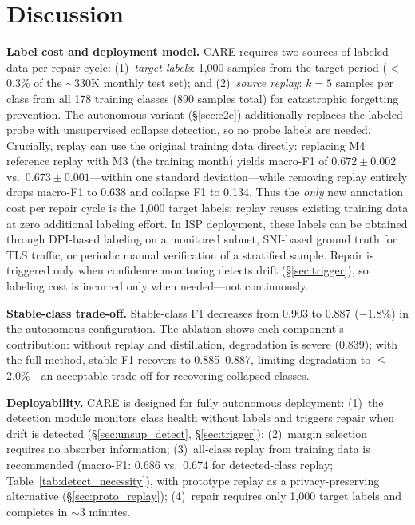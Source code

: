 \documentclass[journal]{IEEEtran}
\newcommand{\ours}{CARE}  %
\begin{document}
\section{Discussion}
\label{sec:discussion}

\textbf{Label cost and deployment model.}
\ours{} requires two sources of labeled data per repair cycle: (1)~\textit{target labels}: 1{,}000 samples from the target period ($<$0.3\% of the ${\sim}$330K monthly test set); and (2)~\textit{source replay}: $k{=}5$ samples per class from all 178 training classes (890 samples total) for catastrophic forgetting prevention.
The autonomous variant (\S\ref{sec:e2e}) additionally replaces the labeled probe with unsupervised collapse detection, so no probe labels are needed.
Crucially, replay can use the original training data directly: replacing M4 reference replay with M3 (the training month) yields macro-F1 of $0.672{\pm}0.002$ vs.\ $0.673{\pm}0.001$---within one standard deviation---while removing replay entirely drops macro-F1 to 0.638 and collapse F1 to 0.134.
Thus the \textit{only} new annotation cost per repair cycle is the 1{,}000 target labels; replay reuses existing training data at zero additional labeling effort.
In ISP deployment, these labels can be obtained through DPI-based labeling on a monitored subnet, SNI-based ground truth for TLS traffic, or periodic manual verification of a stratified sample.
Repair is triggered only when confidence monitoring detects drift (\S\ref{sec:trigger}), so labeling cost is incurred only when needed---not continuously.

\textbf{Stable-class trade-off.}
Stable-class F1 decreases from 0.903 to 0.887 ($-$1.8\%) in the autonomous configuration.
The ablation shows each component's contribution: without replay and distillation, degradation is severe (0.839); with the full method, stable F1 recovers to 0.885--0.887, limiting degradation to ${\leq}$2.0\%---an acceptable trade-off for recovering collapsed classes.

\textbf{Deployability.}
\ours{} is designed for fully autonomous deployment:
(1)~the detection module monitors class health without labels and triggers repair when drift is detected (\S\ref{sec:unsup_detect}, \S\ref{sec:trigger});
(2)~margin selection requires no absorber information;
(3)~all-class replay from training data is recommended (macro-F1: 0.686 vs.\ 0.674 for detected-class replay; Table~\ref{tab:detect_necessity}), with prototype replay as a privacy-preserving alternative (\S\ref{sec:proto_replay});
(4)~repair requires only 1{,}000 target labels and completes in ${\sim}$3 minutes.
\end{document}
